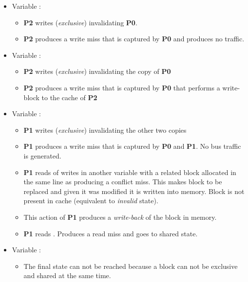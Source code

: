 \begin{itemize}

\item Variable :
  \begin{itemize}
    \item \textbf{\textbf{P2}}  writes  (\emph{exclusive}) invalidating \textbf{P0}.
    \item \textbf{P2} produces a write miss that is captured by \textbf{P0} and produces no traffic.
  \end{itemize}

\item Variable :
  \begin{itemize}
    \item \textbf{P2}  writes   (\emph{exclusive}) invalidating the copy of \textbf{P0}
    \item \textbf{P2} produces a write miss that is captured by \textbf{P0} that performs a write-block to the cache of \textbf{P2}
  \end{itemize}

\item Variable :
  \begin{itemize}
    \item \textbf{P1} writes  (\emph{exclusive}) invalidating the other two copies
    \item \textbf{P1} produces a write miss that is captured by \textbf{P0} and \textbf{P1}. No bus traffic is generated.
    \item \textbf{P1} reads of writes in  another variable with a related block allocated in the same line as  producing a conflict miss. This makes block  to be replaced and given it was modified it is written into memory. Block  is not present in cache (equivalent to \emph{invalid} state).
    \item This action of \textbf{P1} produces a \emph{write-back} of the block in memory. 
    \item \textbf{P1} reads . Produces a read miss and goes to shared state. 
  \end{itemize}

\item Variable :
  \begin{itemize}
    \item The final state can not be reached because a block can not be exclusive and shared at the same time.
  \end{itemize}

\end{itemize}
